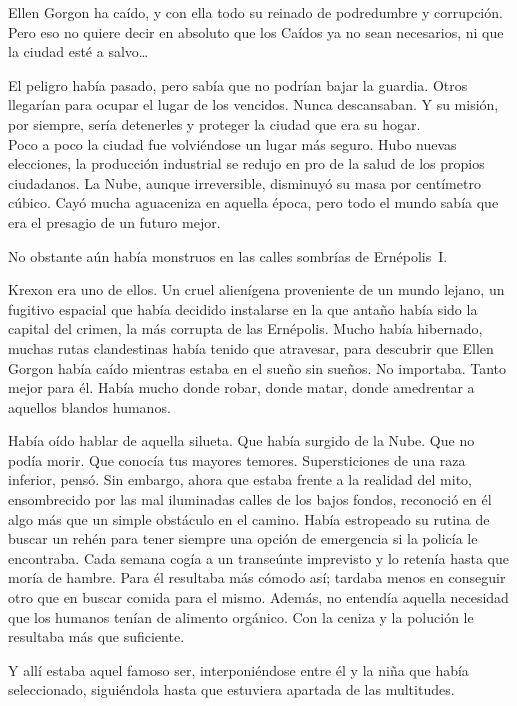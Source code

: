 \begin{prev}
    Ellen Gorgon ha caído, y con ella todo su reinado de podredumbre y corrupción. Pero eso no quiere decir en absoluto que los Caídos ya no sean necesarios, ni que la ciudad esté a salvo\dots
\end{prev}

\noindent{}El peligro había pasado, pero sabía que no podrían bajar la guardia. Otros llegarían para ocupar el lugar de los vencidos. Nunca descansaban. Y su misión, por siempre, sería detenerles y proteger la ciudad que era su hogar.\\

\noindent{}Poco a poco la ciudad fue volviéndose un lugar más seguro. Hubo nuevas elecciones, la producción industrial se redujo en pro de la salud de los propios ciudadanos. La Nube, aunque irreversible, disminuyó su masa por centímetro cúbico. Cayó mucha aguaceniza en aquella época, pero todo el mundo sabía que era el presagio de un futuro mejor.

No obstante aún había monstruos en las calles sombrías de Ernépolis~I.

Krexon era uno de ellos. Un cruel alienígena proveniente de un mundo lejano, un fugitivo espacial que había decidido instalarse en la que antaño había sido la capital del crimen, la más corrupta de las Ernépolis. Mucho había hibernado, muchas rutas clandestinas había tenido que atravesar, para descubrir que Ellen Gorgon había caído mientras estaba en el sueño sin sueños. No importaba. Tanto mejor para él. Había mucho donde robar, donde matar, donde amedrentar a aquellos blandos humanos.

Había oído hablar de aquella silueta. Que había surgido de la Nube. Que no podía morir. Que conocía tus mayores temores. Supersticiones de una raza inferior, pensó. Sin embargo, ahora que estaba frente a la realidad del mito, ensombrecido por las mal iluminadas calles de los bajos fondos, reconoció en él algo más que un simple obstáculo en el camino. Había estropeado su rutina de buscar un rehén para tener siempre una opción de emergencia si la policía le encontraba. Cada semana cogía a un transeúnte imprevisto y lo retenía hasta que moría de hambre. Para él resultaba más cómodo así; tardaba menos en conseguir otro que en buscar comida para el mismo. Además, no entendía aquella necesidad que los humanos tenían de alimento orgánico. Con la ceniza y la polución le resultaba más que suficiente.

Y allí estaba aquel famoso ser, interponiéndose entre él y la niña que había seleccionado, siguiéndola hasta que estuviera apartada de las multitudes.

